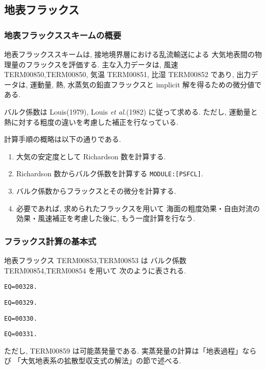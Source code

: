 ﻿
\subsection{地表フラックス}

\subsubsection{地表フラックススキームの概要}

地表フラックススキームは, 
接地境界層における乱流輸送による
大気地表間の物理量のフラックスを評価する.
主な入力データは, 風速 TERM00850,TERM00850, 気温 TERM00851, 比湿 TERM00852 であり,
出力データは, 運動量, 熱, 水蒸気の鉛直フラックスと
implicit 解を得るための微分値である.

バルク係数は Louis(1979), Louis {\em et al.}(1982) に従って求める. 
ただし, 運動量と熱に対する粗度の違いを考慮した補正を行なっている. 

計算手順の概略は以下の通りである.
\begin{enumerate}
\item 大気の安定度として
      Richardson 数を計算する.
\item Richardson 数からバルク係数を計算する \texttt{MODULE:[PSFCL]}.
\item バルク係数からフラックスとその微分を計算する.
\item 必要であれば, 求められたフラックスを用いて
      海面の粗度効果・自由対流の効果・風速補正を考慮した後に,
      もう一度計算を行なう.
\end{enumerate}

\subsubsection{フラックス計算の基本式}

地表フラックス TERM00853,TERM00853 は
バルク係数 TERM00854,TERM00854 を用いて
次のように表される.
%
\begin{verbatim}
EQ=00328.
\end{verbatim}
\begin{verbatim}
EQ=00329.
\end{verbatim}
\begin{verbatim}
EQ=00330.
\end{verbatim}
\begin{verbatim}
EQ=00331.
\end{verbatim}
%
ただし, TERM00859 は可能蒸発量である.
実蒸発量の計算は「地表過程」ならび
「大気地表系の拡散型収支式の解法」の節で述べる.

